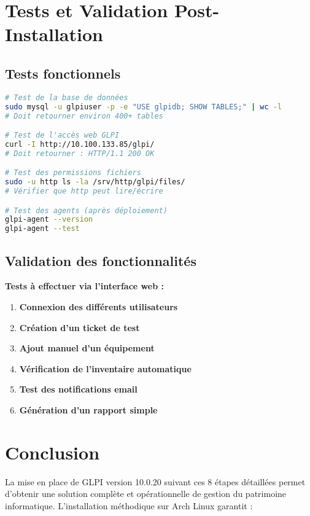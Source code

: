 \documentclass[12pt,a4paper]{article}
\begin{document}
\section{Tests et Validation Post-Installation}

\subsection{Tests fonctionnels}
\begin{lstlisting}[language=bash, caption=Tests de validation système]
# Test de la base de données
sudo mysql -u glpiuser -p -e "USE glpidb; SHOW TABLES;" | wc -l
# Doit retourner environ 400+ tables

# Test de l'accès web GLPI
curl -I http://10.100.133.85/glpi/
# Doit retourner : HTTP/1.1 200 OK

# Test des permissions fichiers
sudo -u http ls -la /srv/http/glpi/files/
# Vérifier que http peut lire/écrire

# Test des agents (après déploiement)
glpi-agent --version
glpi-agent --test
\end{lstlisting}

\subsection{Validation des fonctionnalités}
\textbf{Tests à effectuer via l'interface web :}
\begin{enumerate}
    \item \textbf{Connexion des différents utilisateurs}
    \item \textbf{Création d'un ticket de test}
    \item \textbf{Ajout manuel d'un équipement}
    \item \textbf{Vérification de l'inventaire automatique}
    \item \textbf{Test des notifications email}
    \item \textbf{Génération d'un rapport simple}
\end{enumerate}

\section{Conclusion}

La mise en place de GLPI version 10.0.20 suivant ces 8 étapes détaillées permet d'obtenir une solution complète et opérationnelle de gestion du patrimoine informatique. L'installation méthodique sur Arch Linux garantit :
\end{document}
